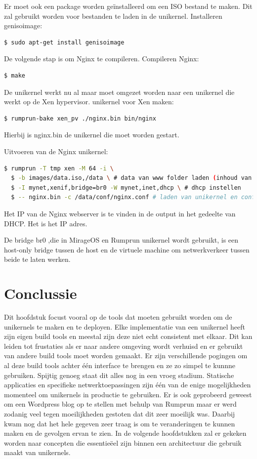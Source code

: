 \documentclass[pdftex,a4paper,12pt,twoside]{report}
\begin{document}
Er moet ook een package worden geïnstalleerd om een ISO bestand te maken. Dit zal gebruikt worden voor bestanden te laden in de unikernel.
\noindent Installeren genisoimage:
\begin{lstlisting}[language=bash]
  $ sudo apt-get install genisoimage
\end{lstlisting}

De volgende stap is om Nginx te compileren.
\noindent Compileren Nginx:
\begin{lstlisting}[language=bash]
  $ make
\end{lstlisting}

De unikernel werkt nu al maar moet omgezet worden naar een unikernel die werkt op de Xen hypervisor.
\noindent unikernel voor Xen maken:
\begin{lstlisting}[language=bash]
  $ rumprun-bake xen_pv ./nginx.bin bin/nginx
\end{lstlisting}

Hierbij is nginx.bin de unikernel die moet worden gestart.

\noindent Uitvoeren van de Nginx unikernel:
\begin{lstlisting}[language=bash]
  $ rumprun -T tmp xen -M 64 -i \
  $ -b images/data.iso,/data \ # data van www folder laden (inhoud van statische website)
  $ -I mynet,xenif,bridge=br0 -W mynet,inet,dhcp \ # dhcp instellen
  $ -- nginx.bin -c /data/conf/nginx.conf # laden van unikernel en configuratie
\end{lstlisting}

Het IP van de Nginx webserver is te vinden in de output in het gedeelte van DHCP. Het is het IP adres.

De bridge br0 ,die in MirageOS en Rumprun unikernel wordt gebruikt, is een host-only bridge tussen de host en de virtuele machine om netwerkverkeer tussen beide te laten werken.

\section{Conclussie}

Dit hoofdstuk focust vooral op de tools dat moeten gebruikt worden om de unikernels te maken en te deployen. Elke implementatie van een unikernel heeft zijn eigen build tools en meestal zijn deze niet echt consistent met elkaar. Dit kan leiden tot frustaties als er naar andere omgeving wordt verhuisd en er gebruikt van andere build tools moet worden gemaakt. Er zijn verschillende pogingen om al deze build tools achter één interface te brengen en ze zo simpel te kunnne gebruiken. Spijtig genoeg staat dit alles nog in een vroeg stadium. Statische applicaties en specifieke netwerktoepassingen zijn één van de enige mogelijkheden momenteel om unikernels in productie te gebruiken. Er is ook geprobeerd geweest om een Wordpress blog op te stellen met behulp van Rumprun maar er werd zodanig veel tegen moeilijkheden gestoten dat dit zeer moeilijk was. Daarbij kwam nog dat het hele gegeven zeer traag is om te veranderingen te kunnen maken en de gevolgen ervan te zien. In de volgende hoofdstukken zal er gekeken worden naar concepten die essentieëel zijn binnen een architectuur die gebruik maakt van unikernels.
\end{document}

